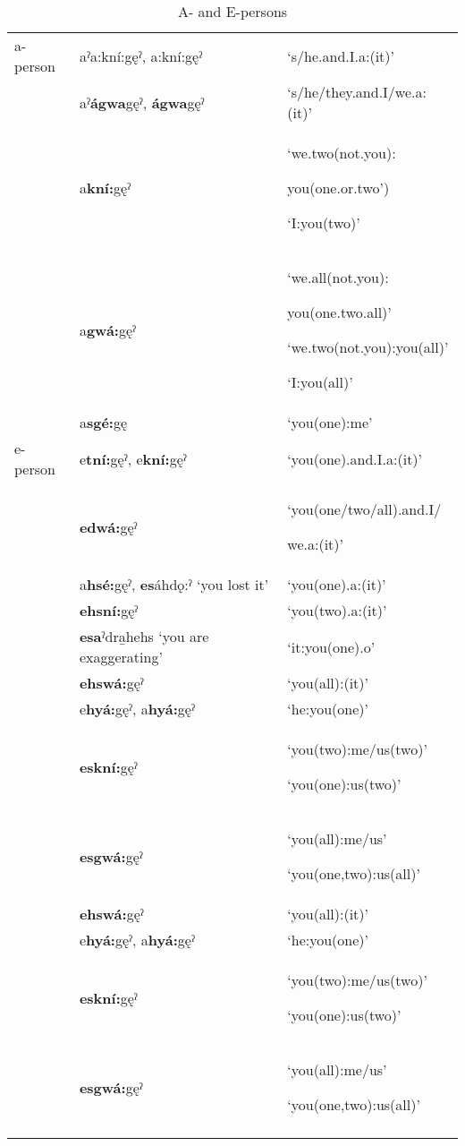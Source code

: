 \begin{table}
\caption{A- and E-persons}
\label{tab:1:aepersons}
\scriptsize{
\begin{tabularx}{\textwidth}{XXX}

\lsptoprule
a-person & aˀa:kní:gęˀ, a:kní:gęˀ & ‘s/he.and.I.a:(it)’\\
& aˀ\textbf{ágwa}gęˀ, \textbf{ágwa}gęˀ & ‘s/he/they.and.I/we.a:(it)’\\
& a\textbf{kní:}gęˀ & ‘we.two(not.you):

you(one.or.two’)

‘I:you(two)’\\
& a\textbf{gwá:}gęˀ & ‘we.all(not.you):

you(one.two.all)’

‘we.two(not.you):you(all)’

‘I:you(all)’\\
& a\textbf{sgé:}gę & ‘you(one):me’ \\
\midrule
e-person & e\textbf{tní:}gęˀ, e\textbf{kní:}gęˀ & ‘you(one).and.I.a:(it)’\\
& \textbf{edwá:}gęˀ & ‘you(one/two/all).and.I/

we.a:(it)’\\
& a\textbf{hsé:}gęˀ, \textbf{es}áhdǫ:ˀ ‘you lost it’ & ‘you(one).a:(it)’\\
& \textbf{ehsní:}gęˀ & ‘you(two).a:(it)’\\
& \textbf{esa}ˀdra̱hehs ‘you are exaggerating’ & ‘it:you(one).o’\\
& \textbf{ehswá:}gęˀ & ‘you(all):(it)’\\
& e\textbf{hyá:}gęˀ, a\textbf{hyá:}gęˀ & ‘he:you(one)’\\
& \textbf{eskní:}gęˀ & ‘you(two):me/us(two)’

‘you(one):us(two)’\\
& \textbf{esgwá:}gęˀ & ‘you(all):me/us’

‘you(one,two):us(all)’\\
& \textbf{ehswá:}gęˀ & ‘you(all):(it)’\\
& e\textbf{hyá:}gęˀ, a\textbf{hyá:}gęˀ & ‘he:you(one)’\\
& \textbf{eskní:}gęˀ & ‘you(two):me/us(two)’

‘you(one):us(two)’\\
& \textbf{esgwá:}gęˀ & ‘you(all):me/us’

‘you(one,two):us(all)’\\
\lspbottomrule
\end{tabularx}}
\end{table}

